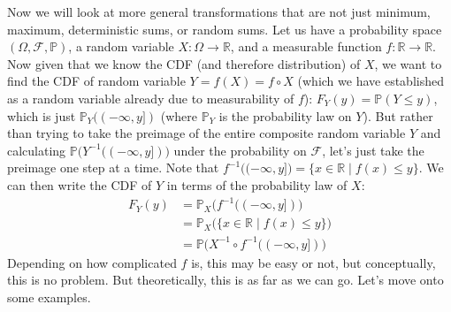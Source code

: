 \documentclass{article}
\begin{document}
      Now we will look at more general transformations that are not just minimum, maximum, deterministic sums, or random sums. Let us have a probability space $(\Omega, \mathcal{F}, \mathbb{P})$, a random variable $X: \Omega \rightarrow \mathbb{R}$, and a measurable function $f: \mathbb{R} \rightarrow \mathbb{R}$. Now given that we know the CDF (and therefore distribution) of $X$, we want to find the CDF of random variable $Y = f(X) = f \circ X$ (which we have established as a random variable already due to measurability of $f$): $F_Y (y) = \mathbb{P}(Y \leq y)$, which is just $\mathbb{P}_Y ((-\infty, y])$ (where $\mathbb{P}_Y$ is the probability law on $Y$). But rather than trying to take the preimage of the entire composite random variable $Y$ and calculating $\mathbb{P}\big( Y^{-1}((-\infty, y]) \big)$ under the probability on $\mathcal{F}$, let's just take the preimage one step at a time. Note that $f^{-1} \big( (-\infty, y] \big) = \{x \in \mathbb{R} \mid f(x) \leq y\}$. We can then write the CDF of $Y$ in terms of the probability law of $X$: 
      \begin{align*}
        F_Y (y) & = \mathbb{P}_X \big( f^{-1} ((-\infty, y]) \big) \\
        & = \mathbb{P}_X \big( \{x \in \mathbb{R} \mid f(x) \leq y\} \big) \\
        & = \mathbb{P} \big( X^{-1} \circ f^{-1} ((-\infty, y]) \big) 
      \end{align*}
      Depending on how complicated $f$ is, this may be easy or not, but conceptually, this is no problem. But theoretically, this is as far as we can go. Let's move onto some examples. 
\end{document}
